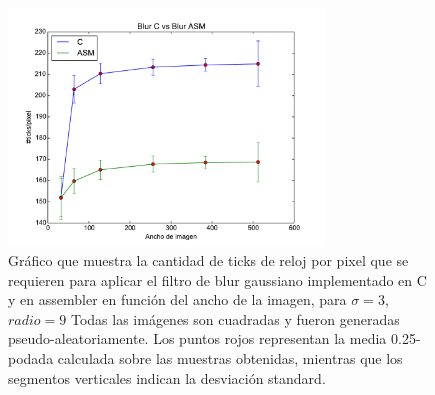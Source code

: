 \begin{figure}
 	\centering
 	\includegraphics[width=0.75\textwidth]{../graficos/blur_v2_lineplot_03-1.pdf}
	\caption{\footnotesize Gráfico que muestra la cantidad de ticks de reloj por pixel que se requieren para aplicar el filtro de blur gaussiano implementado en C y en assembler en función del ancho de la imagen, para $\sigma = 3$, $radio = 9$ Todas las imágenes son cuadradas y fueron generadas pseudo-aleatoriamente. Los puntos rojos representan la media 0.25-podada calculada sobre las muestras obtenidas, mientras que los segmentos verticales indican la desviación standard.}
	\label{fig:lineplot.diff}
\end{figure}



